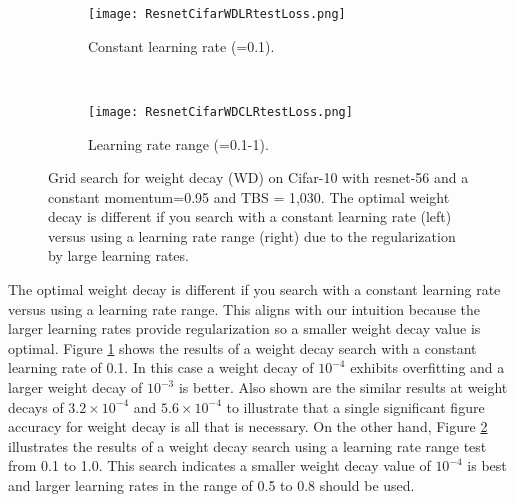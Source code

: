 \documentclass{article} %
\begin{document}
\begin{figure}[tbh]
	\centering
	\begin{subfigure}[b]{0.5\textwidth}
		\texttt{[image: ResnetCifarWDLRtestLoss.png]}
		\caption{Constant learning rate (=0.1).}
		\label{fig:ResnetCifarWDLRtestLoss}       %
	\end{subfigure}
	\quad
	\hfill
	~ %
	\centering
	\begin{subfigure}[b]{0.43\textwidth}
		\texttt{[image: ResnetCifarWDCLRtestLoss.png]}
		\caption{Learning rate range (=0.1-1).}
		\label{fig:ResnetCifarWDCLRtestLoss}       %
	\end{subfigure}
	\caption{Grid search for weight decay (WD) on Cifar-10 with resnet-56 and a  constant momentum=0.95 and TBS = 1,030. The optimal weight decay is different if you search with a constant learning rate (left) versus using a learning rate range (right) due to the regularization by large learning rates. }
	\label{fig:ResnetCifarWD}
	\vspace{-5pt}	
\end{figure}

The optimal weight decay is different if you search with a constant learning rate versus using a learning rate range.  This aligns with our intuition because the larger learning rates provide regularization so a smaller weight decay value is optimal.   Figure \ref{fig:ResnetCifarWDLRtestLoss} shows the results of a weight decay search with a constant learning rate of 0.1.  In this case a weight decay of $10^{-4}$ exhibits overfitting and a larger weight decay of $10^{-3}$ is better.  Also shown are the similar results at weight decays of $3.2 \times 10^{-4}$ and $5.6 \times 10^{-4}$ to illustrate that a single significant figure accuracy for weight decay is all that is necessary.   On the other hand, Figure \ref{fig:ResnetCifarWDCLRtestLoss} illustrates the results of a weight decay search using a learning rate range test from 0.1 to 1.0.  This search indicates a smaller weight decay value of $10^{-4}$ is best and larger learning rates in the range of 0.5 to 0.8 should be used. 

\end{document}
